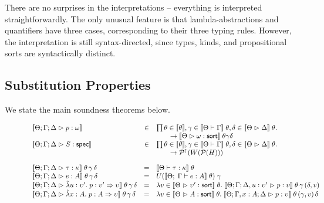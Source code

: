There are no surprises in the interpretations -- everything is
interpreted straightforwardly. The only unusual feature is that
lambda-abstractions and quantifiers have three cases, corresponding to
their three typing rules. However, the interpretation is still
syntax-directed, since types, kinds, and propositional sorts are
syntactically distinct.

\subsection{Substitution Properties}

We state the main soundness theorems below. 

\begin{figure}
\begin{displaymath}
\begin{array}{lcl}
\interp{\judgeA{p}{\omega}} & \in & \prod \theta \in \interp{\theta}, \gamma \in \interp{\judgectx{\Theta}{\Gamma}}\;\theta, \delta \in \interp{\judgeACtx{\Delta}}\;\theta.\\
                            &     & \qquad \to \interp{\judgeSort{\omega}}\;\theta \gamma \delta \\
\interp{\judgeS{S}}         & \in & \prod \theta \in \interp{\theta}, \gamma \in \interp{\judgectx{\Theta}{\Gamma}}\;\theta, \delta \in \interp{\judgeACtx{\Delta}}\;\theta.\\
                            &     &\qquad\to \upset{W(\powerset{H})} \\[1em]

\interp{\judgeA{\tau}{\kappa}}\;\theta\,\gamma\,\delta & = & \interp{\judgeWK{\tau}{\kappa}}\;\theta \\

\interp{\judgeA{e}{A}}\;\theta\,\gamma\,\delta & = &  U(\interp{\judgeE{\Gamma}{e}{A}}\;\theta)\;\gamma \\

\interp{\judgeA{\pfun{u}{\upsilon'}{p}}{\upsilon' \To \upsilon}}\;\theta\,\gamma\,\delta & = & 
   \semfun{v \in \interp{\judgeSort{\upsilon'}}\;\theta}
          {\interp{\judgeA[\Theta; \Gamma; \Delta,u:\upsilon']{p}{\upsilon}}\;\theta\,\gamma\,(\delta, v)} \\

\interp{\judgeA{\pfun{x}{A}{p}}{A \To \upsilon}}\;\theta\,\gamma\,\delta & = & 
   \semfun{v \in \interp{\judgeSort{A}}\;\theta}
          {\interp{\judgeA[\Theta;\Gamma,x:A;\Delta]{p}{\upsilon}}\;\theta\,(\gamma,v)\,\delta} \\


\end{array}
\end{displaymath}
\end{figure}
